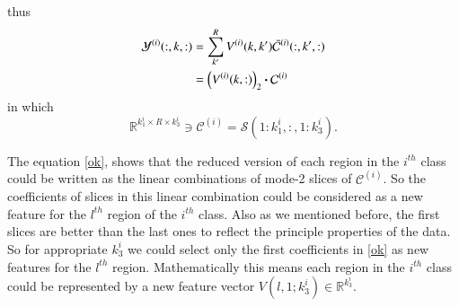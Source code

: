 \documentclass[preprint,12pt]{elsarticle}
\newcommand{\trans}{\mathsf{T}}
\begin{document}
	thus
	\begin{align}
	\label{ok}
	{\mathcal{Y}}^{(i)}(:,k,:) &= \sum_{k'}^{R} V^{(i)}(k,k')\bar{\mathcal{C}}^{(i)}(:,k',:) \notag
	\\&= \left( V^{(i)}(k,:)\right)_2 \boldsymbol{\cdot} {\mathcal{C}}^{(i)}
	\end{align}
	in which 
	\[
	\mathbb{R}^{k_1^i\times R \times k_3^i}\ni {\mathcal{C}}^{(i)} = \mathcal{S}(1:k_1^i,:,1:k_3^i).
	\]
	
	The equation \eqref{ok}, shows that the reduced version of each region in the $i^{th}$ class could be
	written as the linear combinations of  mode-2 slices of $\mathcal{C}^{(i)}$. So the coefficients of slices in this linear combination could be considered as a new feature for the $l^{th}$ region of the $i^{th}$ class. Also as we mentioned before, the first slices are better than the last ones to reflect the principle properties of the data. So for appropriate $k_3^i$ we could select only the first coefficients in \eqref{ok} as new features for the $l^{th}$ region. Mathematically this means each region  in the $i^{th}$ class could be represented by a new feature vector $V(l,1;k_3^i)\in \mathbb{R}^{k_3^i}$.   
	
\end{document}
